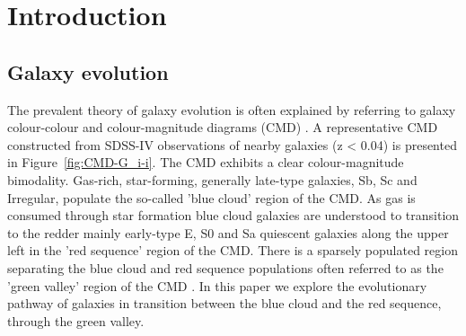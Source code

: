 \section{Introduction}
\label{sec:introduction}

\subsection{Galaxy evolution}
\label{sec:evolution}

The prevalent theory of galaxy evolution is often explained  by  referring to galaxy colour-colour and colour-magnitude diagrams (CMD) \citep[see e.g.][]{2001AJ....122.1861S, 2003ApJ...585L...5H, 2003ApJS..149..289B,baldry2004quantifying,2006MNRAS.373..469B}. A representative CMD constructed from SDSS-IV observations of nearby galaxies (z < 0.04)  is presented in  Figure~\ref{fig:CMD-G_i-i}. The CMD exhibits a clear colour-magnitude bimodality.  Gas-rich, star-forming, generally late-type galaxies, Sb, Sc and Irregular, populate the so-called 'blue cloud' region of the CMD. As gas is consumed through star formation blue cloud galaxies are understood to transition to the redder mainly early-type E, S0 and Sa quiescent galaxies along the upper left in the 'red sequence' region of the CMD. There is a sparsely populated region separating the blue cloud and red sequence populations often referred to as the 'green valley' region of the CMD \citep{2004ApJ...608..752B}. In this paper we explore the evolutionary pathway of galaxies in transition between the blue cloud and the red sequence, through the green valley.

